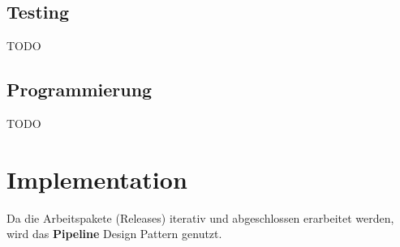 \documentclass[11pt]{article}
\begin{document}
    \subsection{Testing}
    TODO

    \subsection{Programmierung}
    TODO

    \section{Implementation}
    Da die Arbeitspakete (Releases) iterativ und abgeschlossen erarbeitet werden, wird das
    \textbf{Pipeline} Design Pattern\cite{pipeline} genutzt.

    \newpage

    ~\nocite{*}
    \renewcommand{\refname}{Quellen}
    
    
\end{document}

